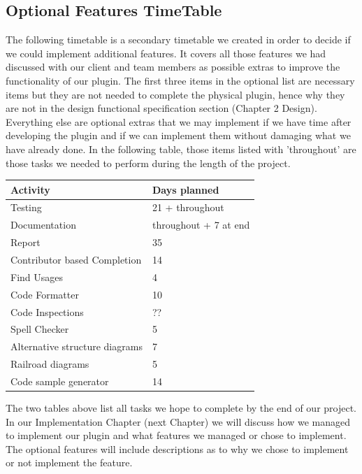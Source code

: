 \subsection{Optional Features TimeTable}
The following timetable is a secondary timetable we created in order to decide if we could implement additional features. It covers all those features we had discussed with our client and team members as possible extras to improve the functionality of our plugin. The first three items in the optional list are necessary items but they are not needed to complete the physical plugin, hence why they are not in the design functional specification section (Chapter 2 Design). Everything else are optional extras that we may implement if we have time after developing the plugin and if we can implement them without damaging what we have already done. In the following table, those items listed with 'throughout' are those tasks we needed to perform during the length of the project.
\begin{center}
    \begin{tabular}{ | l | l |}
    \hline
    \textbf{Activity} & \textbf{Days planned}  \\ \hline
    Testing & 21 + throughout     \\ \hline
    Documentation & throughout + 7 at end   \\ \hline
    Report & 35  \\ \hline
    Contributor based Completion  & 14\\ \hline
    Find Usages & 4 \\ \hline
    Code Formatter & 10\\ \hline
    Code Inspections & ?? \\ \hline
    Spell Checker & 5\\ \hline
    Alternative structure diagrams & 7 \\ \hline
    Railroad diagrams & 5 \\ \hline
    Code sample generator & 14 \\ \hline
    \end{tabular}
\end{center}

The two tables above list all tasks we hope to complete by the end of our project. In our Implementation Chapter (next Chapter) we will discuss how we managed to implement our plugin and what features we managed or chose to implement. The optional features will include descriptions as to why we chose to implement or not implement the feature. 
